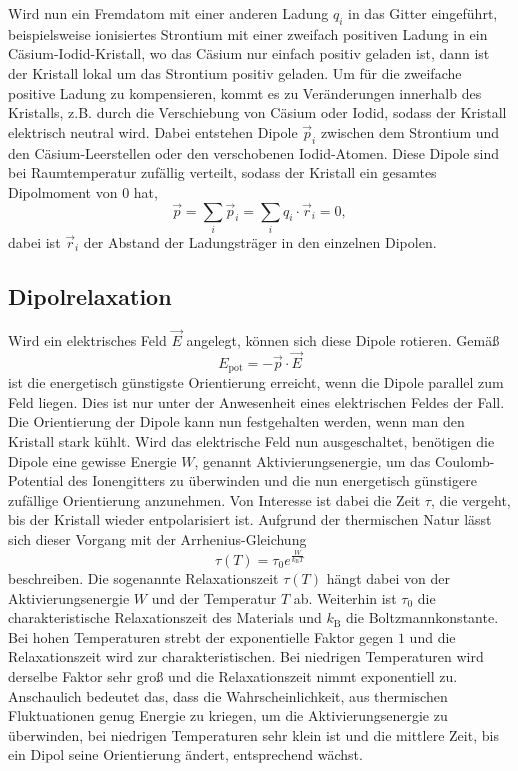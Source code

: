 Wird nun ein Fremdatom mit einer anderen Ladung $q_i$ in das Gitter eingeführt, beispielsweise ionisiertes Strontium mit einer zweifach positiven Ladung in ein Cäsium-Iodid-Kristall, wo das Cäsium nur einfach positiv geladen ist,
dann ist der Kristall lokal um das Strontium positiv geladen. Um für die zweifache positive Ladung zu kompensieren, kommt es zu Veränderungen innerhalb des Kristalls, z.B. durch die Verschiebung von Cäsium oder Iodid, sodass der Kristall
elektrisch neutral wird. Dabei entstehen Dipole $\vec{p}_i$ zwischen dem Strontium und den Cäsium-Leerstellen oder den verschobenen Iodid-Atomen. Diese Dipole sind bei Raumtemperatur zufällig verteilt, sodass der Kristall ein gesamtes Dipolmoment von 0 hat,
\begin{equation*}
    \vec{p} = \sum_i \vec{p}_i = \sum_i q_i \cdot \vec{r}_i = 0,
 \end{equation*}
 dabei ist $\vec{r}_i$ der Abstand der Ladungsträger in den einzelnen Dipolen.




\subsection{Dipolrelaxation}

Wird ein elektrisches Feld $\vec{E}$ angelegt, können sich diese Dipole rotieren. Gemäß
\begin{equation*}
    E_\text{pot} = - \vec{p} \cdot \vec{E}
\end{equation*}
ist die energetisch günstigste Orientierung erreicht, wenn die Dipole parallel zum Feld liegen. Dies ist nur unter der Anwesenheit eines elektrischen Feldes der Fall.
Die Orientierung der Dipole kann nun festgehalten werden, wenn man den Kristall stark kühlt. Wird das elektrische Feld nun ausgeschaltet, benötigen die Dipole eine gewisse Energie $W$, genannt Aktivierungsenergie, um das Coulomb-Potential des Ionengitters zu überwinden
und die nun energetisch günstigere zufällige Orientierung anzunehmen. 
Von Interesse ist dabei die Zeit $\tau$, die vergeht, bis der Kristall wieder entpolarisiert ist. Aufgrund der thermischen Natur lässt sich dieser Vorgang mit der Arrhenius-Gleichung \cite{fuller}
\begin{equation}
    \tau\left(T\right) = \tau_0 e^{\frac{W}{k_\text{B}T}}
    \label{eq:arrhenius}
\end{equation}
beschreiben. Die sogenannte Relaxationszeit $\tau\left(T\right)$ hängt dabei von der Aktivierungsenergie $W$ und der Temperatur $T$ ab. Weiterhin ist $\tau_0$ die charakteristische Relaxationszeit des Materials und $k_\text{B}$
die Boltzmannkonstante. Bei hohen Temperaturen strebt der exponentielle Faktor gegen $1$ und die Relaxationszeit wird zur charakteristischen. Bei niedrigen Temperaturen wird derselbe Faktor sehr groß und die Relaxationszeit nimmt exponentiell zu.
Anschaulich bedeutet das, dass die Wahrscheinlichkeit, aus thermischen Fluktuationen genug Energie zu kriegen, um die Aktivierungsenergie zu überwinden, bei niedrigen Temperaturen sehr klein ist und die mittlere Zeit, bis ein Dipol seine Orientierung ändert, entsprechend wächst.

